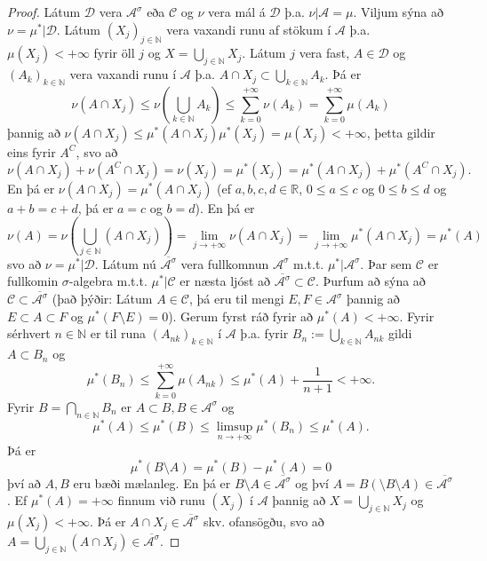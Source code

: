 \documentclass[a4paper,icelandic,11pt]{book}
\theoremstyle{plain}      \newtheorem{setn}{Setning}[chapter]
\theoremstyle{definition} \newtheorem{skilgr}[setn]{Skilgreining}
\theoremstyle{remark}     \newtheorem*{ath}{Athugasemd}
\newcommand{\R}{\mathbb R}
\newcommand{\N}{\mathbb N}
\begin{document}
\begin{proof}
  Látum $\mathcal D$ vera $\mathcal A^\sigma$ eða $\mathcal C$ og $\nu$
  vera mál á $\mathcal D$ þ.a. $\nu|\mathcal A = \mu$. Viljum sýna að
  $\nu = \mu^*|\mathcal D$. Látum $(X_j)_{j\in\N}$ vera vaxandi runu af
  stökum í $\mathcal A$ þ.a. $\mu(X_j) < +\infty$ fyrir öll $j$ og $X =
  \bigcup_{j\in\N} X_j$. Látum $j$ vera fast, $A\in\mathcal D$ og
  $(A_k)_{k\in\N}$ vera vaxandi runu í $\mathcal A$ þ.a. $A\cap
  X_j\subset\bigcup_{k\in\N} A_k$. Þá er 
  \[
  \nu(A\cap X_j)
  \le \nu \left( \bigcup_{k\in\N} A_k \right)
  \le \sum_{k=0}^{+\infty}\nu(A_k)
  = \sum_{k=0}^{+\infty}\mu(A_k)
  \]
  þannig að $\nu(A\cap X_j)\le\mu^*(A\cap X_j)\mu^*(X_j) = \mu(X_j) <
  +\infty$, þetta gildir eins fyrir $A^C$, svo að 
  \[
  \nu(A\cap X_j) + \nu(A^C\cap X_j)
  = \nu(X_j)
  = \mu^*(X_j)
  = \mu^*(A\cap X_j) + \mu^*(A^C\cap X_j).
  \]
  En þá er $\nu(A\cap X_j) = \mu^*(A\cap X_j)$ (ef $a,b,c,d\in\R$, $0\le
  a \le c$ og $0\le b\le d$ og $a+b=c+d$, þá er $a=c$ og $b=d$). En þá
  er 
  \[
  \nu(A)
  = \nu\left( \bigcup_{j\in\N} (A\cap X_j) \right)
  = \lim_{j\to+\infty}\nu(A\cap X_j)
  = \lim_{j\to+\infty}\mu^*(A\cap X_j)
  = \mu^*(A)
  \]
  svo að $\nu = \mu^*|\mathcal D$. Látum nú $\overline{\mathcal
  A^\sigma}$ vera fullkomnun $\mathcal A^\sigma$ m.t.t. $\mu^*|\mathcal
  A^\sigma$. Þar sem $\mathcal C$ er fullkomin $\sigma$-algebra m.t.t.
  $\mu^*|\mathcal C$ er næsta ljóst að $\overline{\mathcal
  A^\sigma}\subset\mathcal C$. Þurfum að sýna að $\mathcal
  C\subset\overline{\mathcal A^\sigma}$ (það þýðir: Látum $A\in\mathcal
  C$, þá eru til mengi $E,F\in\mathcal A^\sigma$ þannig að $E\subset
  A\subset F$ og $\mu^*(F\setminus E) = 0$). Gerum fyrst ráð fyrir að
  $\mu^*(A) < +\infty$. Fyrir sérhvert $n\in\N$ er til runa
  $(A_{nk})_{k\in\N}$ í $\mathcal A$ þ.a. fyrir $B_n :=
  \bigcup_{k\in\N} A_{nk}$ gildi $A\subset B_n$ og 
  \[
  \mu^*(B_n)
  \le \sum_{k=0}^{+\infty}\mu(A_{nk})
  \le \mu^*(A) + \frac{1}{n+1}
  < +\infty.
  \]
  Fyrir $B = \bigcap_{n\in\N}B_n$ er $A\subset B, B\in\mathcal A^\sigma$
  og 
  \[
  \mu^*(A)
  \le \mu^*(B)
  \le \limsup_{n\to+\infty}\mu^*(B_n)
  \le \mu^*(A).
  \]
  Þá er 
  \[
  \mu^*(B\setminus A) 
  = \mu^*(B) - \mu^*(A)
  = 0
  \]
  því að $A,B$ eru bæði mælanleg. En þá er $B\setminus
  A\in\overline{\mathcal A^\sigma}$ og því $A = B(\setminus B\setminus
  A)\in\overline{\mathcal A^\sigma}$. Ef $\mu^*(A) = +\infty$ finnum við
  runu $(X_j)$ í $\mathcal A$ þannig að $X = \bigcup_{j\in\N}X_j$ og
  $\mu(X_j) < +\infty$. Þá er $A\cap X_j \in\overline{\mathcal
  A^\sigma}$ skv. ofansögðu, svo að $A = \bigcup_{j\in\N}(A\cap
  X_j)\in\overline{\mathcal A^\sigma}$.
\end{proof}
\end{document}
